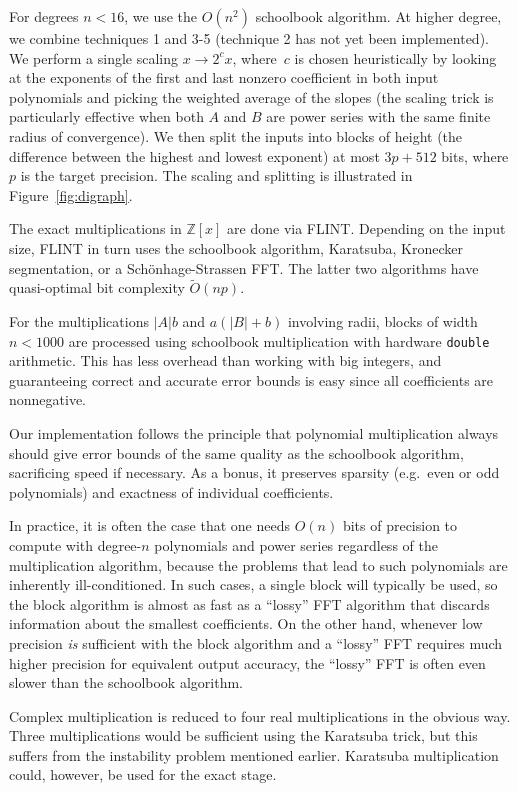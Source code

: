 \documentclass[10pt,journal,compsoc,cspaper]{IEEEtran}
\begin{document}
For degrees $n < 16$, we use the $O(n^2)$
schoolbook algorithm. At higher degree, we combine techniques 1 and
3-5 (technique 2 has not yet been implemented). We
perform a single scaling $x \to 2^c x$, where~$c$ is chosen
heuristically by looking at the exponents of the first and last
nonzero coefficient in both input polynomials and picking the weighted
average of the slopes
(the scaling trick is particularly effective when both $A$ and $B$ are power series
with the same finite radius of convergence).
We then split the inputs into blocks of height
(the difference between the highest and lowest exponent) at most $3 p
+ 512$ bits, where $p$ is the target precision.
The scaling and splitting is illustrated in Figure~\ref{fig:digraph}.

The exact
multiplications in $\mathbb{Z}[x]$ are done via FLINT. Depending on
the input size, FLINT in turn uses the schoolbook algorithm, Karatsuba,
Kronecker segmentation, or a Sch\"onhage-Strassen FFT.
The latter two algorithms have quasi-optimal bit complexity $\tilde{O}(n
p)$.

For the multiplications $|A| b$ and $a
(|B| + b)$ involving radii, blocks of width $n < 1000$ are processed using
schoolbook multiplication with hardware \texttt{double} arithmetic.
This has less overhead than working with
big integers, and guaranteeing
correct and accurate error bounds is easy since all coefficients
are nonnegative.

Our implementation follows the principle that polynomial
multiplication always should give error bounds of the same quality as
the schoolbook algorithm, sacrificing speed if necessary.
As a bonus, it preserves sparsity (e.g.\ even or odd polynomials)
and exactness of individual coefficients.

In practice, it is often the case that one needs $O(n)$ bits of precision
to compute with degree-$n$ polynomials and power series
regardless of the multiplication algorithm,
because the problems that lead to such polynomials
are inherently ill-conditioned.
In such cases, a single block will typically be used, so the
block algorithm is almost as fast as a ``lossy''
FFT algorithm that discards information about the smallest coefficients.
On the other hand, whenever low precision \emph{is} sufficient
with the block algorithm and a ``lossy'' FFT requires
much higher precision for equivalent output accuracy,
the ``lossy'' FFT is often even slower than the schoolbook algorithm.

Complex multiplication is reduced to four real multiplications
in the obvious way. Three multiplications would be sufficient
using the Karatsuba trick, but this suffers from the
instability problem mentioned earlier. Karatsuba multiplication
could, however, be used for the exact stage.
\end{document}
